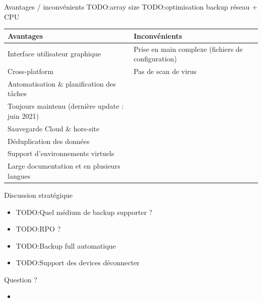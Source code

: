 \documentclass[aspectratio=169]{beamer}
\newcommand{\TODO}{TODO:}
\begin{document}
\begin{frame}{Avantages / inconvénients}
\TODO array size
 \TODO optimisation backup réseau + CPU
    \begin{center}
     \begin{tabular}{|l|l|}
     \hline
      \textbf{Avantages} & \textbf{Inconvénients} \\
     \hline
     \hline
        Interface utilisateur graphique & Prise en main complexe (fichiers de configuration) \\
     \hline
      Cross-platform & Pas de scan de virus\\
     \hline
      Automatisation \& planification des tâches \\
     \hline
     Toujours maintenu (dernière update : juin 2021) \\
     \hline
     Sauvegarde Cloud \& hors-site & \\
     \hline
     Déduplication des données & \\
     \hline
     Support d'environnements virtuels & \\
     \hline
     Large documentation et en plusieurs langues & \\
     \hline
     \end{tabular}

    \end{center}

\end{frame}

\begin{frame}{Discussion stratégique}
 \begin{itemize}
  \item \TODO Quel médium de backup supporter ?
  \item \TODO RPO ?
  \item \TODO Backup full automatique
  \item \TODO Support des devices déconnecter
 \end{itemize}
\end{frame}

\begin{frame}{Question ?}
 \begin{itemize}
  \item 
 \end{itemize}
\end{frame}
\end{document}
